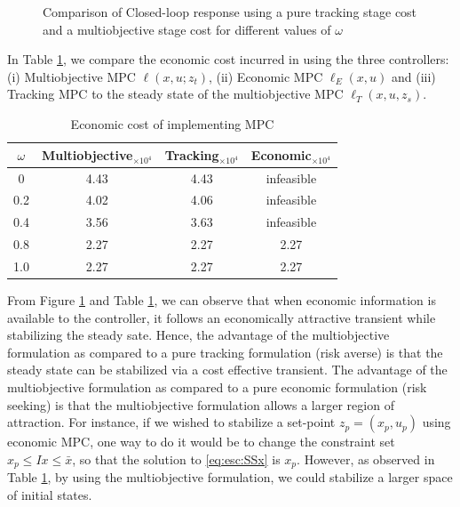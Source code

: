 \documentclass{elsarticle}
\theoremstyle{definition}
\begin{document}
\begin{figure}
\centering
\scriptsize
{\resizebox{\textwidth}{!}{}}
{\resizebox{\textwidth}{!}{}}
{\resizebox{\textwidth}{!}{}}
\caption{Comparison of Closed-loop response using a pure tracking
  stage cost and a multiobjective stage cost for different values of
  $\omega$}%
\label{fig:esc:CL}
\end{figure}

In Table \ref{tab:esc:CL}, we compare the economic cost incurred in using
the three controllers: (i) Multiobjective MPC $\ell(x,u;z_t)$, (ii)
Economic MPC $\ell_E(x,u)$ and (iii) Tracking MPC to the steady state
of the multiobjective MPC $\ell_T(x,u,z_s)$. 

\begin{table}[h]
\caption{Economic cost of implementing MPC}
\label{tab:esc:CL}
\centering
\begin{tabular}{cccc}\toprule
$\omega$ & Multiobjective$ _{ \times 10^{4}}$ & Tracking$ _{ \times 10^{4}}$ & Economic$ _{ \times 10^{4}}$ \\
\midrule
0 & 4.43 & 4.43 & infeasible \\
0.2 & 4.02 & 4.06 & infeasible \\
0.4 & 3.56 & 3.63 & infeasible \\
0.8 & 2.27 & 2.27 & 2.27 \\
1.0 & 2.27 & 2.27 & 2.27 \\
\bottomrule
\end{tabular}
\end{table}

From Figure \ref{fig:esc:CL} and Table \ref{tab:esc:CL}, we can
observe that when economic information is available to the controller,
it follows an economically attractive transient while stabilizing the
steady sate. Hence, the advantage of the multiobjective formulation as
compared to a pure tracking formulation (risk averse) is that the
steady state can be stabilized via a cost effective transient. The
advantage of the multiobjective formulation as compared to a pure
economic formulation (risk seeking) is that the multiobjective
formulation allows a larger region of attraction. For instance, if we
wished to stabilize a set-point $z_p = (x_p,u_p)$ using economic MPC,
one way to do it would be to change the constraint set $x_p \leq Ix \leq
\bar{x}$, so that the solution to \eqref{eq:esc:SSx} is
$x_p$. However, as observed in Table \ref{tab:esc:CL}, by using the
multiobjective formulation, we could stabilize a larger space of
initial states. 
\end{document}
